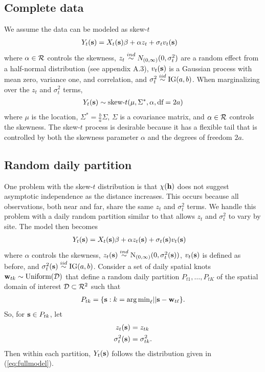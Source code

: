 \documentclass[11pt]{article}
\begin{document}
\subsection{Complete data}\label{s:data}
We assume the data can be modeled as skew-$t$ \citep{Zhang2010}
\begin{align} \label{eq:fullmodel}
  Y_t(\mbox{\bf s}) &= X_t(\mbox{\bf s}) \beta + \alpha z_t + \sigma_t v_t(\mbox{\bf s})
\end{align}
where $\alpha \in {\cal R}$ controls the skewness, $z_{t} \stackrel{ind}{\sim} N_{(0, \infty)}(0, \sigma^2_t)$ are a random effect from a half-normal distribution (see appendix A.3), $v_t(\mbox{\bf s})$ is a Gaussian process with mean zero, variance one, and \Matern correlation, and $\sigma^2_t \stackrel{iid}{\sim} \text{IG}(a, b)$.
When marginalizing over the $z_t$ and $\sigma^2_t$ terms,
\begin{align*}
  Y_t(\mbox{\bf s}) \sim \text{skew-}t (\mu, \Sigma^*, \alpha, \text{df} = 2a)
\end{align*}
where $\mu$ is the location, $\Sigma^* = \frac{ b }{ a } \Sigma$, $\Sigma$ is a \Matern covariance matrix, and $\alpha \in {\cal R}$ controls the skewness.
The skew-$t$ process is desirable because it has a flexible tail that is controlled by both the skewness parameter $\alpha$ and the degrees of freedom $2a$.

\subsection{Random daily partition}\label{s:part}
One problem with the skew-$t$ distribution is that $\chi(\mbox{\bf h})$ does not suggest asymptotic independence as the distance increases.
This occurs because all observations, both near and far, share the same $z_t$ and $\sigma^2_t$ terms.
We handle this problem with a daily random partition similar to \citet{Huser2014} that allows $z_t$ and $\sigma^2_t$ to vary by site.
The model then becomes
\begin{align}
  Y_t(\mbox{\bf s}) &= X_t(\mbox{\bf s}) \beta + \alpha z_t(\mbox{\bf s}) + \sigma_t(\mbox{\bf s}) v_t(\mbox{\bf s})
\end{align}
where $\alpha$ controls the skewness, $z_t(\mbox{\bf s}) \stackrel{ind}{\sim} \text{N}_{(0, \infty)}(0, \sigma^2_t(\mbox{\bf s}))$, $v_t(\mbox{\bf s})$ is defined as before, and $\sigma^2_t(\mbox{\bf s}) \stackrel{iid}{\sim} \text{IG}(a, b)$.
Consider a set of daily spatial knots $\mbox{\bf w}_{tk} \sim \text{Uniform}({\cal D})$ that define a random daily partition $P_{t1}, \ldots, P_{tK}$ of the spatial domain of interest ${\cal D} \subset {\cal R}^2$ such that
\begin{align*}
  P_{tk} = \{ \mbox{\bf s} : k = {\mathop{\rm arg\, min}}_\ell || \mbox{\bf s} - \mbox{\bf w}_{t\ell} \}.
\end{align*}
So, for $\mbox{\bf s} \in P_{tk}$, let
\begin{align}
  z_t(\mbox{\bf s}) &= z_{tk} \label{eq:sitez}\\
  \sigma^2_t(\mbox{\bf s}) &= \sigma^2_{tk} \label{eq:sitesig}.
\end{align}
Then within each partition, $Y_t(\mbox{\bf s})$ follows the distribution given in (\ref{eq:fullmodel}).
\end{document}
